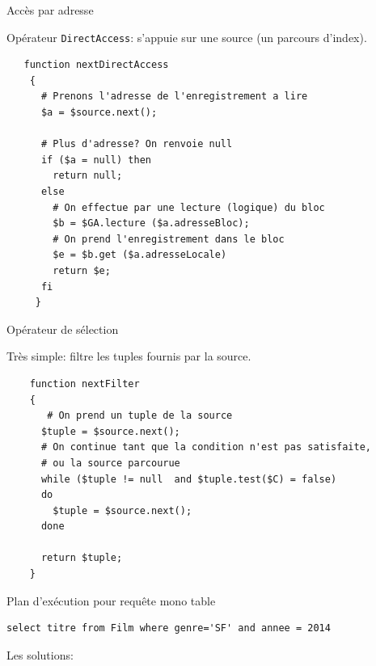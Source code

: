 \begin{frame}[fragile]{Accès par adresse}

Opérateur \texttt{DirectAccess}: s'appuie sur une source (un parcours d'index).

\vfill

\begin{verbatim}
   function nextDirectAccess
    {
      # Prenons l'adresse de l'enregistrement a lire
      $a = $source.next();
      
      # Plus d'adresse? On renvoie null
      if ($a = null) then
        return null;
      else
        # On effectue par une lecture (logique) du bloc
        $b = $GA.lecture ($a.adresseBloc);      
        # On prend l'enregistrement dans le bloc
        $e = $b.get ($a.adresseLocale)           
        return $e;
      fi 
     }
\end{verbatim}

\end{frame}


\begin{frame}[fragile]{Opérateur de sélection}

Très simple: filtre les tuples fournis par la source.

\begin{verbatim}
    function nextFilter
    {
       # On prend un tuple de la source
      $tuple = $source.next();
      # On continue tant que la condition n'est pas satisfaite, 
      # ou la source parcourue
      while ($tuple != null  and $tuple.test($C) = false)
      do
        $tuple = $source.next();        
      done
      
      return $tuple;
    }
\end{verbatim}

\end{frame}

\begin{frame}[fragile]{Plan d'exécution pour requête mono table}

\begin{verbatim}
select titre from Film where genre='SF' and annee = 2014
\end{verbatim}

\medskip

Les solutions:


\end{frame}


